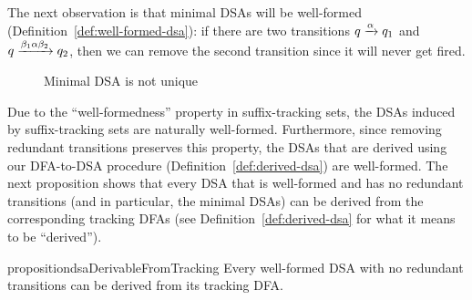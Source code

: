 The next  observation
is that minimal DSAs will be well-formed (Definition~\ref{def:well-formed-dsa}): if there are two transitions
$q \xrightarrow{\alpha} q_1$ and $q \xrightarrow{\beta_1 \alpha \beta_2} q_2$, then we can remove
the second transition since it will never get fired.

\begin{figure}[t]
  \centering
  \caption{Minimal DSA is not unique}
  \label{fig:no-canonical}
\end{figure}



Due to the ``well-formedness'' property in
suffix-tracking sets, the DSAs induced by suffix-tracking sets are
naturally well-formed. Furthermore, since removing redundant transitions preserves
this property, the DSAs that are derived using our DFA-to-DSA
procedure (Definition~\ref{def:derived-dsa}) are well-formed. The next
proposition shows that every DSA that is well-formed and has no
redundant transitions (and in particular, the minimal
DSAs) can be derived from the corresponding tracking DFAs (see Definition~\ref{def:derived-dsa} for what it means to be ``derived'').


\begin{restatable}{proposition}{dsaDerivableFromTracking}
  \label{prop:dsa-derivable-from-tracking-dfa}
  Every well-formed DSA with no redundant transitions can
  be derived from its tracking DFA.
\end{restatable}

